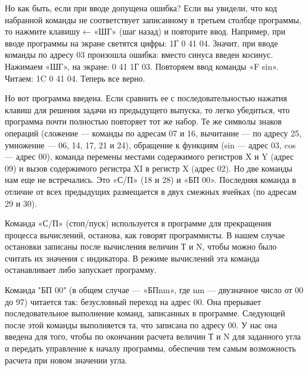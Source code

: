 \documentclass[11pt,a4paper,oneside]{article}
\begin{document}
Но как быть, если при вводе допущена ошибка? Если вы увидели, что код набранной команды не соответствует записанному в третьем столбце программы, то нажмите клавишу ← «ШГ» (шаг назад) и повторите ввод. Например, при вводе программы на экране светятся цифры: 1Г 0 41 04. Значит, при вводе команды по адресу 03 произошла ошибка: вместо синуса введен косинус. Нажимаем «ШГ», на экране: 0 41 1Г 03. Повторяем ввод команды «F sin». Читаем: 1C 0 41 04. Теперь все верно.

Но вот программа введена. Если сравнить ее с последовательностью нажатия клавиш для решения задачи из предыдущего выпуска, то легко убедиться, что программа почти полностью повторяет тот же набор. Те же символы знаков операций (сложение — команды по адресам 07 и 16, вычитание — по адресу 25, умножение — 06, 14, 17, 21 и 24), обращение к функциям (sin — адрес 03, cos — адрес 00), команда перемены местами содержимого регистров X и Y (адрес 09) и вызов содержимого регистра XI в регистр X (адрес 02). Но две команды нам еще не встречались. Это «С/П» (18 и 28) и «БП 00». Последняя команда в отличие от всех предыдущих размещается в двух смежных ячейках (по адресам 29 и 30).

Команда «С/П» (стоп/пуск) используется в программе для прекращения процесса вычислений, останова, как говорят программисты. В нашем случае остановки записаны после вычисления величин Т и N, чтобы можно было считать их значения с индикатора. В режиме вычислений эта команда останавливает либо запускает программу.

Команда "БП 00" (в общем случае — «БПnm», где nm — двузначное число от 00 до 97) читается так: безусловный переход на адрес 00. Она прерывает последовательное выполнение команд, записанных в программе. Следующей после этой команды выполняется та, что записана по адресу 00. У нас она введена для того, чтобы по окончании расчета величин Т и N для заданного угла α передать управление к началу программы, обеспечив тем самым возможность расчета при новом значении угла.
\end{document}
